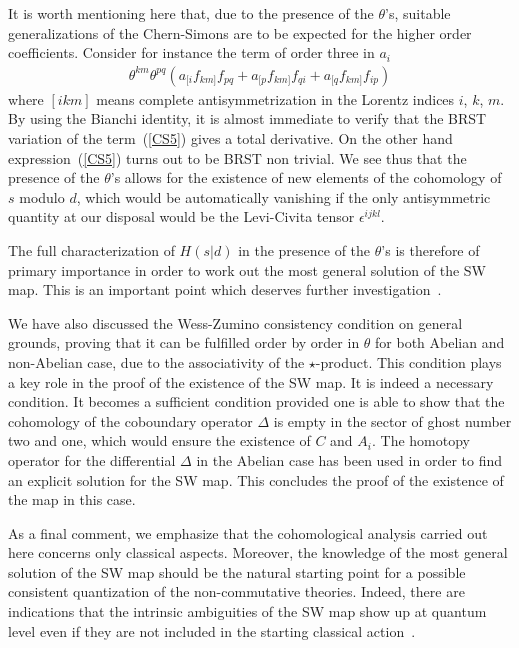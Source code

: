 \documentclass[a4paper,12pt]{article}
\begin{document}
It is worth mentioning here that, due to the presence of the $\theta$'s,
 suitable generalizations of the Chern-Simons are to be expected for the
 higher order coefficients.
Consider for instance the term of order three in $a_i$
%
\begin{eqnarray}
\theta^{km}\theta^{pq}\left(
a_{[i} f_{km]} f_{pq}+
a_{[p} f_{km]} f_{qi}+
a_{[q} f_{km]} f_{ip}\right)\label{CS5}
\end{eqnarray}
%
where $[ikm]$ means complete antisymmetrization in the Lorentz indices
 $i$, $k$, $m$.
By using the Bianchi identity, it is almost immediate to verify that the BRST
 variation of the term~(\ref{CS5}) gives a total derivative.
On the other hand expression~(\ref{CS5}) turns out to be BRST non trivial.
We see thus that the presence of the $\theta$'s allows for
 the existence of new elements of the cohomology of $s$ modulo $d$,
 which would be automatically vanishing if the only antisymmetric
 quantity at our disposal would be the Levi-Civita tensor
 $\epsilon^{ijkl}$.

The full characterization of $H(s|d)$ in the presence of the
 $\theta$'s is therefore of primary importance in order to work out
 the most general solution of the SW map.
This is an important point which deserves further
 investigation~\cite{WorkInProgress}.

We have also discussed the Wess-Zumino consistency condition on general
 grounds, proving that it can be fulfilled order by order in $\theta$
 for both Abelian and non-Abelian case, due to the associativity of the
 $\star$-product.
This condition plays a key role in the proof of the existence of the SW map.
It is indeed a necessary condition.
It becomes a sufficient condition provided one is able to show that the
 cohomology of the coboundary operator $\Delta$ is empty in the sector of
 ghost number two and one, which would ensure the existence of $C$ and $A_i$.
The homotopy operator for the differential $\Delta$
 in the Abelian case has been used in order to find an explicit solution for
 the SW map.
This concludes the proof of the existence of the map in this case.

As a final comment, we emphasize that the cohomological analysis carried out
 here concerns only classical aspects.
Moreover, the knowledge of the most general solution of the SW map should be
 the natural starting point for a possible consistent quantization of the 
 non-commutative theories.
Indeed, there are indications that the intrinsic ambiguities of the SW map
 show up at quantum level even if they are not included in the starting
 classical action~\cite{Jurco:2001rq,Bichl:2001cq}.
 
\end{document}
